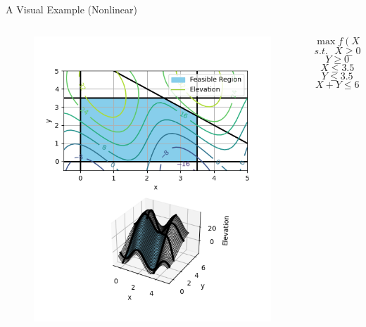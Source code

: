 \documentclass[10pt, aspectratio=169]{beamer}
\begin{document}
\begin{frame}{A Visual Example (Nonlinear)}
    \begin{columns}
        \begin{column}{0.5\textwidth}
            \begin{figure}
                \includegraphics[width=0.9\linewidth]{NonlinearObjective.png}
            \end{figure}
        \end{column}
        \begin{column}{0.5\textwidth}
            $$\max f(X,Y)$$
            $$s.t. \ \ \ X\geq 0$$
            $$Y \geq 0$$
            $$X \leq 3.5$$
            $$Y \leq 3.5$$
            $$X + Y \leq 6$$
        \end{column}
    \end{columns}
\end{frame}
\end{document}
